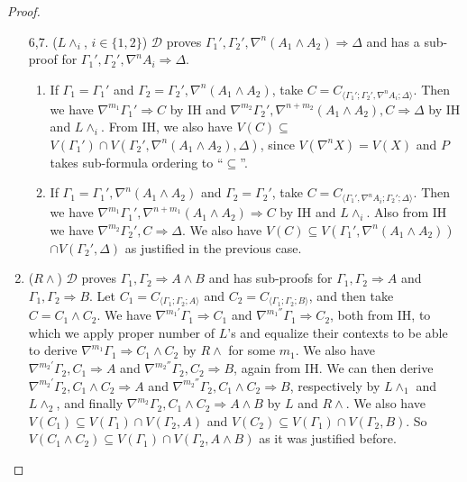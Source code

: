 \documentclass[12pt,a4paper]{article}
\theoremstyle{plain}
\theoremstyle{definition}
\begin{document}
\begin{proof}
\begin{enumerate}
		\item[6,7.] ($L\land_i$, {\small$i \in \{1,2\}$}) $\mathcal{D}$ proves $\Gamma_1' , \Gamma_2' , \nabla^n (A_1 \land A_2) \Rightarrow \Delta$ and has a sub-proof for $\Gamma_1' , \Gamma_2' , \nabla^n A_i \Rightarrow \Delta$.
		\begin{enumerate}
			\item If $\Gamma_1 = \Gamma_1'$ and $\Gamma_2 = \Gamma_2' , \nabla^n (A_1 \land A_2)$, take $C = C_{\langle\Gamma_1';\Gamma_2',\nabla^n A_i;\Delta\rangle}$. Then we have $\nabla^{m_1} \Gamma_1' \Rightarrow C$ by IH and $\nabla^{m_2} \Gamma_2' , \nabla^{n+m_2} (A_1 \land A_2), C \Rightarrow \Delta$ by IH and $L\land_i$. From IH, we also have $V(C) \subseteq$ $V(\Gamma_1') \cap V(\Gamma_2',\nabla^n(A_1 \land A_2),\Delta)$, since $V(\nabla^n X) = V(X)$ and $P$ takes sub-formula ordering to ``$\subseteq$''.
			
			\item If $\Gamma_1 = \Gamma_1' , \nabla^n (A_1 \land A_2)$ and $\Gamma_2 = \Gamma_2'$, take $C = C_{\langle\Gamma_1',\nabla^n A_i;\Gamma_2';\Delta\rangle}$. Then we have $\nabla^{m_1} \Gamma_1',\nabla^{n+m_1} (A_1 \wedge A_2) \Rightarrow C$ by IH and $L\wedge_i$. Also from IH we have $\nabla^{m_2} \Gamma_2', C \Rightarrow \Delta$. We also have $V(C) \subseteq V(\Gamma_1',\nabla^n (A_1 \land A_2))$ $\cap V(\Gamma_2',\Delta)$ as justified in the previous case.
		\end{enumerate}
		\setcounter{enumi}{7}

		\item ($R\land$) $\mathcal{D}$ proves $\Gamma_1 , \Gamma_2 \Rightarrow A \land B$ and has sub-proofs for $\Gamma_1 , \Gamma_2 \Rightarrow A$ and $\Gamma_1 , \Gamma_2 \Rightarrow B$.
		Let $C_1 = C_{\langle\Gamma_1;\Gamma_2;A\rangle}$ and $C_2 = C_{\langle\Gamma_1;\Gamma_2;B\rangle}$, and then take $C = C_1 \land C_2$.
		We have $\nabla^{m_1'} \Gamma_1 \Rightarrow C_1$ and $\nabla^{m_1''} \Gamma_1 \Rightarrow C_2$, both from IH, to which we apply proper number of $L$'s and equalize their contexts to be able to derive $\nabla^{m_1} \Gamma_1 \Rightarrow C_1 \wedge C_2$ by $R\wedge$ for some $m_1$.
		We also have $\nabla^{m_2'} \Gamma_2 , C_1 \Rightarrow A$ and $\nabla^{m_2''} \Gamma_2 , C_2 \Rightarrow B$, again from IH.
		We can then derive $\nabla^{m_2'} \Gamma_2 , C_1 \land C_2 \Rightarrow A$ and $\nabla^{m_2''} \Gamma_2 , C_1 \land C_2 \Rightarrow B$, respectively by $L\land_1$ and $L\land_2$, and finally  $\nabla^{m_2} \Gamma_2 , C_1 \land C_2 \Rightarrow A \land B$ by $L$ and $R\land$.
		We also have $V(C_1) \subseteq V(\Gamma_1) \cap V(\Gamma_2 , A)$ and $V(C_2) \subseteq V(\Gamma_1) \cap V(\Gamma_2 , B)$. So $V(C_1 \land C_2) \subseteq V(\Gamma_1) \cap V(\Gamma_2 , A \land B)$ as it was justified before.


\end{enumerate}
\end{proof}
\end{document}
